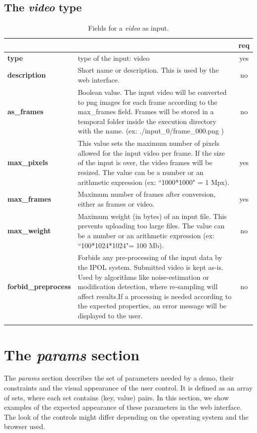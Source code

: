 \subsection{The \emph{video} type}

\begin{longtable}{|>{\bf}L{\linewidth}|L{\linewidth}|c|}
\hline
{}     &  & {\bf req} \tabularnewline 
\hline \hline
 type         & type of the input: video & yes \\ \hline
 description  & Short name or description. This is used by the web interface. & no \\ \hline
 as\_frames & Boolean value. The input video will be converted to png images for each frame according to the max\_frames field. Frames
 will be stored in a temporal folder inside the execution directory with the name. (ex: ./input\_0/frame\_000.png ) & no \\ \hline
 max\_pixels   & This value sets the maximum number of pixels allowed for the input video per frame. If the size of the input is over, the video frames will be resized. The value can be a number or an arithmetic expression (ex: ``1000*1000" = 1 Mpx).  & yes \\ \hline 
 max\_frames  &  Maximum number of frames after conversion, either as frames or video.  & yes \\ \hline
 max\_weight   & Maximum weight (in bytes) of an input file. This prevents uploading too large files. The value can be a number or an arithmetic expression (ex: ``100*1024*1024"= 100 Mb). & no \\ \hline
forbid\_preprocess & Forbids any pre-processing of the input data by the IPOL system. Submitted video is kept as-is. Used by algorithms like noise-estimation or modification detection, where re-sampling will affect results.If a processing is needed according to the expected properties, an error message will be displayed to the user.
& no \\ \hline
\caption{Fields for a \emph{video} as input.}
\end{longtable}

\section{The \emph{params} section}
The \emph{params} section describes the set of parameters needed by a demo, their constraints and the visual appearance of the user control. It is defined as an array of sets, where each set contains (key, value) pairs. In this section, we show examples of the expected appearance of these parameters in the web interface. The look of the controls might differ depending on the operating system and the browser used.


